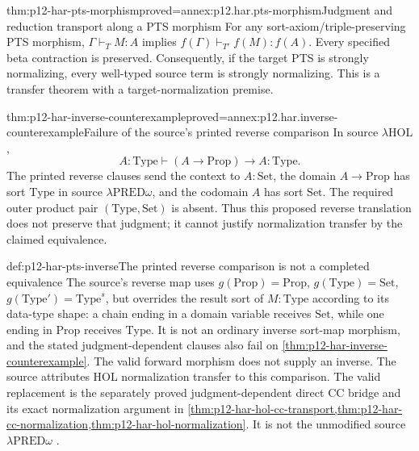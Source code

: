 \begin{hbtheorem}{thm:p12-har-pts-morphism}{proved=annex:p12.har.pts-morphism}{Judgment and reduction transport along a PTS morphism}
For any sort-axiom/triple-preserving PTS morphism,
\(\Gamma\vdash_T M:A\) implies
\(f(\Gamma)\vdash_{T'}f(M):f(A)\). Every specified beta
contraction is preserved. Consequently, if the target PTS is strongly
normalizing, every well-typed source term is strongly normalizing.
This is a transfer theorem with a target-normalization premise.
\end{hbtheorem}

\begin{hbtheorem}{thm:p12-har-inverse-counterexample}{proved=annex:p12.har.inverse-counterexample}{Failure of the source's printed reverse comparison}
In source \(\lambda\mathrm{HOL}\),
\[
 A:\mathrm{Type}\vdash(A\to\mathrm{Prop})\to A:\mathrm{Type}.
\]
The printed reverse clauses send the context to
\(A:\mathrm{Set}\), the domain \(A\to\mathrm{Prop}\)
has sort \(\mathrm{Type}\) in source
\(\lambda\mathrm{PRED}\omega\), and the codomain \(A\)
has sort \(\mathrm{Set}\). The required outer product pair
\((\mathrm{Type},\mathrm{Set})\) is absent. Thus this proposed
reverse translation does not preserve that judgment; it cannot justify
normalization transfer by the claimed equivalence.
\end{hbtheorem}

\begin{proofboundary}{def:p12-har-pts-inverse}{The printed reverse comparison is not a completed equivalence}
The source's reverse map uses
\(g(\mathrm{Prop})=\mathrm{Prop}\),
\(g(\mathrm{Type})=\mathrm{Set}\),
\(g(\mathrm{Type}')=\mathrm{Type}^s\), but overrides the
result sort of \(M:\mathrm{Type}\) according to its data-type
shape: a chain ending in a domain variable receives \(\mathrm{Set}\),
while one ending in \(\mathrm{Prop}\) receives \(\mathrm{Type}\).
It is not an ordinary inverse sort-map morphism, and the stated
judgment-dependent clauses also fail on
\cref{thm:p12-har-inverse-counterexample}. The valid forward morphism
does not supply an inverse. The source attributes HOL normalization
transfer to this comparison. The valid replacement is the separately
proved judgment-dependent direct CC bridge and its exact normalization
argument in
\cref{thm:p12-har-hol-cc-transport,thm:p12-har-cc-normalization,thm:p12-har-hol-normalization}.
It is not the unmodified source \(\lambda\mathrm{PRED}\omega\)
\cite[pp.~1201--1202]{BarendregtGeuvers2001}.
\end{proofboundary}


